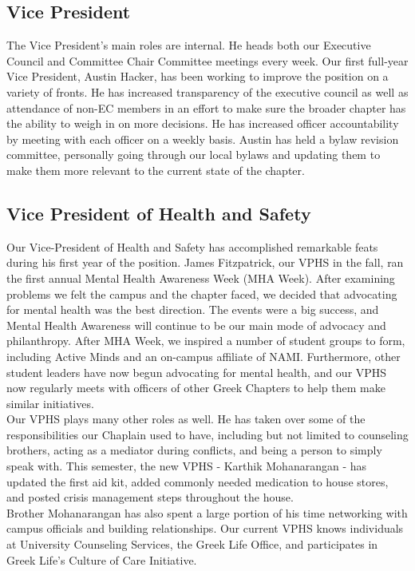       \subsection*{Vice President}
	The Vice President's main roles are internal. He heads both our Executive Council and Committee Chair Committee meetings every week. Our first full-year Vice President, Austin Hacker, has been working to improve the position on a variety of fronts. He has increased transparency of the executive council as well as attendance of non-EC members in an effort to make sure the broader chapter has the ability to weigh in on more decisions. He has increased officer accountability by meeting with each officer on a weekly basis. Austin has held a bylaw revision committee, personally going through our local bylaws and updating them to make them more relevant to the current state of the chapter.
	
      \subsection*{Vice President of Health and Safety}
	Our Vice-President of Health and Safety has accomplished remarkable feats during his first year of the position. James Fitzpatrick, our VPHS in the fall, ran the first annual Mental Health Awareness Week (MHA Week). After examining problems we felt the campus and the chapter faced, we decided that advocating for mental health was the best direction. The events were a big success, and Mental Health Awareness will continue to be our main mode of advocacy and philanthropy. After MHA Week, we inspired a number of student groups to form, including Active Minds and an on-campus affiliate of NAMI. Furthermore, other student leaders have now begun advocating for mental health, and our VPHS now regularly meets with officers of other Greek Chapters to help them make similar initiatives. \\

	Our VPHS plays many other roles as well. He has taken over some of the responsibilities our Chaplain used to have, including but not limited to counseling brothers, acting as a mediator during conflicts, and being a person to simply speak with. This semester, the new VPHS - Karthik Mohanarangan - has updated the first aid kit, added commonly needed medication to house stores, and posted crisis management steps throughout the house. \\

	Brother Mohanarangan has also spent a large portion of his time networking with campus officials and building relationships. Our current VPHS knows individuals at University Counseling Services, the Greek Life Office, and participates in Greek Life's Culture of Care Initiative.
	
